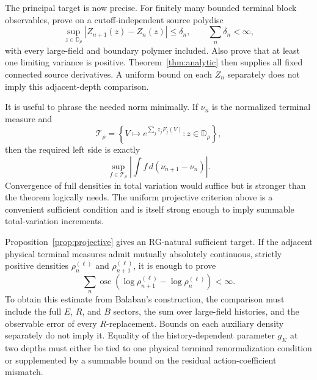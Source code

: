 \documentclass[11pt]{article}
\theoremstyle{definition}
\theoremstyle{remark}
\newcommand{\D}{\mathbb D}
\begin{document}
The principal target is now precise.  For finitely many bounded terminal block
observables, prove on a cutoff-independent source polydisc
\[
 \sup_{z\in\D_\rho}|Z_{n+1}(z)-Z_n(z)|\le\delta_n,
 \qquad \sum_n\delta_n<\infty,
\]
with every large-field and boundary polymer included.  Also prove that at least
one limiting variance is positive.  Theorem~\ref{thm:analytic} then supplies all
fixed connected source derivatives.  A uniform bound on each $Z_n$ separately
does not imply this adjacent-depth comparison.

It is useful to phrase the needed norm minimally.  If $\nu_n$ is the normalized
terminal measure and
\[
 \mathcal T_\rho=\left\{V\mapsto
 e^{\sum_jz_jF_j(V)}:z\in\D_\rho\right\},
\]
then the required left side is exactly
\[
 \sup_{f\in\mathcal T_\rho}\left|\int f\,d(\nu_{n+1}-\nu_n)\right|.
\]
Convergence of full densities in total variation would suffice but is stronger
than the theorem logically needs.  The uniform projective criterion above is a
convenient sufficient condition and is itself strong enough to imply summable
total-variation increments.

Proposition~\ref{prop:projective} gives an RG-natural sufficient target.  If
the adjacent physical terminal measures admit mutually absolutely continuous,
strictly positive densities $\rho_n^{(\ell)}$ and
$\rho_{n+1}^{(\ell)}$, it is enough to prove
\[
 \sum_n\operatorname{osc}\left(
  \log\rho_{n+1}^{(\ell)}-\log\rho_n^{(\ell)}\right)<\infty.
\]
To obtain this estimate from Balaban's construction, the comparison must include
the full $E$, $R$, and $B$ sectors, the sum over large-field histories, and the
observable error of every $R$-replacement.  Bounds on each auxiliary density
separately do not imply it.  Equality of the history-dependent parameter $g_K$
at two depths must either be tied to one physical terminal renormalization
condition or supplemented by a summable bound on the residual action-coefficient
mismatch.
\end{document}
